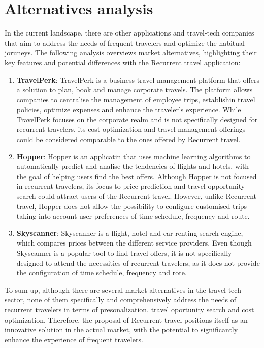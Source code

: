 \documentclass[../memory.tex]{subfiles}
\begin{document}
\section{Alternatives analysis}
In the current landscape, there are other applications and travel-tech companies
that aim to address the needs of frequent travelers and optimize the habitual
joruneys. The following analysis overviews market alternatives, highlighting
their key features and potential differences with the Recurrent travel
application:
\begin{enumerate}[label = -]
	\item \textbf{TravelPerk}\cite{travel-perk}: TravelPerk is a business travel
	      management platform that offers a solution to plan, book and manage
	      corporate travels. The platform allows companies to centralise the
	      management of employee trips, establishin travel policies, optimize expenses
	      and enhance the traveler's experience. While TravelPerk focuses on the
	      corporate realm and is not specifically designed for recurrent travelers,
	      its cost optimization and travel management offerings could be considered
	      comparable to the ones offered by Recurrent travel.
	\item \textbf{Hopper}\cite{hopper}: Hopper is an applicatin that uses machine
	      learning algorithms to automatically predict and analise the tendencies of
	      flights and hotels, with the goal of helping users find the best offers.
	      Although Hopper is not focused in recurrent travelers, its focus to price
	      prediction and travel opportunity search could attract users of the
	      Recurrent travel. However, unlike Recurrent travel, Hopper does not allow
	      the possibility to configure customised trips taking into account user
	      preferences of time schedule, frequency and route.
	\item \textbf{Skyscanner}\cite{skyscanner}: Skyscanner is a flight, hotel
	      and car renting search engine, which compares prices between the
	      different service providers. Even though Skyscanner is a popular tool
	      to find travel offers, it is not specifically designed to attend the
	      necessities of recurrent travelers, as it does not provide the
	      configuration of time schedule, frequency and rote.
\end{enumerate}
To sum up, although there are several market alternatives in the travel-tech
sector, none of them specifically and comprehensively address the needs of
recurrent travelers in terms of presonalization, travel oportunity search and
cost optimization. Therefore, the proposal of Recurrent travel positions itself
as an innovative solution in the actual market, with the potential to
significantly enhance the experience of frequent travelers.
\end{document}
